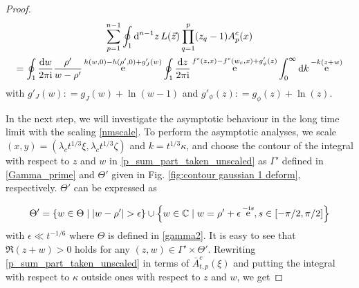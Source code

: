 \documentclass[cmp]{svjour}
\numberwithin{theorem}{section}
\numberwithin{equation}{section}
\DeclareMathOperator{\e}{e}
\def\dd{{\rm d}}
\def\ii{{\rm i}}
\begin{document}
\begin{proof}
\begin{multline}
\label{p_sum_part_taken_unscaled}
\sum_{p=1}^{n-1} \oint_1 \dd^{n-1} z\,  L(\vec{z}) \prod_{q=1}^{p}(z_q-1) A^c_p(x) \\
= \oint_{1} \frac{\dd w}{2 \pi \ii} \frac{\rho'}{w - \rho'}  \e^{ h(w,0)- h(\rho',0) + g'_J(w)} \oint_1 \frac{\dd z}{2 \pi \ii}  \e^{f^c(z,x)- f^c(w_c,x) + g'_{\phi}(z)} \int_{0}^{\infty} \dd k \e^{-k(z + w)}
\end{multline}
with $g'_J(w) : = g_J(w) + \ln(w-1)$ and $g'_\phi(z) : = g_\phi(z) + \ln(z)$.

In the next step, we will investigate the asymptotic behaviour in the long time limit with the scaling \eqref{nmscale}.
To perform the asymptotic analyses, we scale $(x,y)= ( \lambda_c t^{1/3} \xi, \lambda_c t^{1/3} \zeta )$ and $k = t^{1/3} \kappa$, and choose the contour of the integral with respect to $z$ and $w$ in \eqref{p_sum_part_taken_unscaled} as $\Gamma'$ defined in \eqref{Gamma_prime} and $\Theta'$ given in Fig. \ref{fig:contour gaussian 1 deform}, respectively.
$\Theta'$ can be expressed as


\begin{equation*}
\label{Contour_Theta_prime}
\Theta' =  \left\{ w \in \Theta \mid |w - \rho'| > \epsilon \right\} \cup \left\{ w \in \mathbb{C} \mid w = \rho' + \epsilon \e^{- \ii s } , s \in [- \pi/2 , \pi/2] \right\}
\end{equation*}
with $\epsilon \ll t^{-1/6}$ where $\Theta$ is defined in \eqref{gamma2}. It is easy to see that $\Re(z + w) > 0$ holds for any $(z , w) \in \Gamma' \times \Theta'$.
Rewriting \eqref{p_sum_part_taken_unscaled} in terms of $\bar{A}^c_{t,p}(\xi)$ and putting the integral with respect to $\kappa$ outside ones with respect to $z$ and $w$, we get 


\end{proof}
\end{document}
